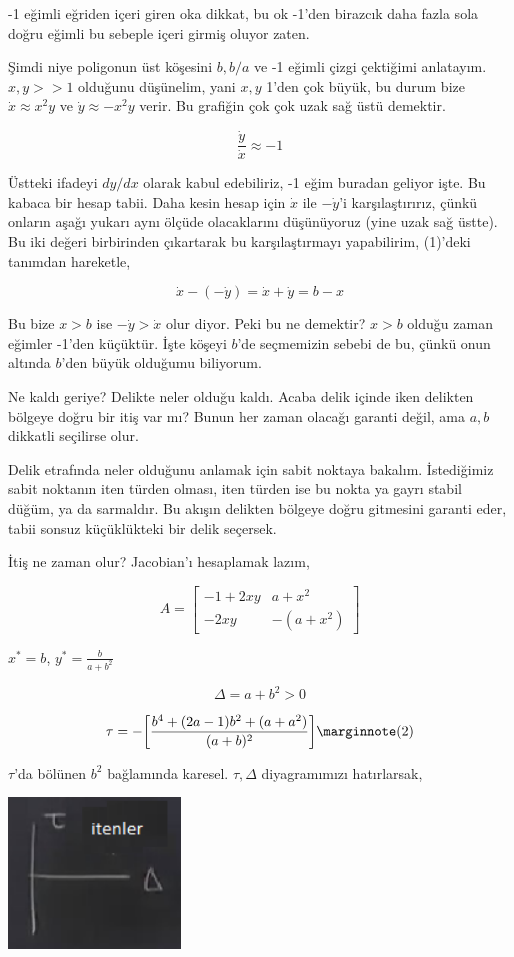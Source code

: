 \documentclass[12pt,fleqn]{article}\usepackage{../../common}
\begin{document}
-1 eğimli eğriden içeri giren oka dikkat, bu ok -1'den birazcık daha fazla sola
doğru eğimli bu sebeple içeri girmiş oluyor zaten.

Şimdi niye poligonun üst köşesini $b,b/a$ ve -1 eğimli çizgi çektiğimi
anlatayım. $x,y >> 1$ olduğunu düşünelim, yani $x,y$ 1'den çok büyük, bu durum
bize $\dot{x} \approx x^2y$ ve $\dot{y} \approx -x^2y$ verir. Bu grafiğin çok
çok uzak sağ üstü demektir.

$$ \frac{\dot{y}}{\dot{x}} \approx -1 $$

Üstteki ifadeyi $dy/dx$ olarak kabul edebiliriz, -1 eğim buradan geliyor
işte. Bu kabaca bir hesap tabii. Daha kesin hesap için $\dot{x}$ ile
$-\dot{y}$'i karşılaştırırız, çünkü onların aşağı yukarı aynı ölçüde
olacaklarını düşünüyoruz (yine uzak sağ üstte). Bu iki değeri birbirinden
çıkartarak bu karşılaştırmayı yapabilirim, (1)'deki tanımdan hareketle, 

$$ \dot{x} - (-\dot{y})  = \dot{x} + \dot{y} = b-x $$

Bu bize $x>b$ ise  $-\dot{y} > \dot{x}$ olur diyor. Peki bu ne demektir? $x>b$
olduğu zaman eğimler -1'den küçüktür. İşte köşeyi $b$'de seçmemizin sebebi de
bu, çünkü onun altında $b$'den büyük olduğumu biliyorum.

Ne kaldı geriye? Delikte neler olduğu kaldı. Acaba delik içinde iken delikten
bölgeye doğru bir itiş var mı? Bunun her zaman olacağı garanti değil, ama $a,b$
dikkatli seçilirse olur.

Delik etrafında neler olduğunu anlamak için sabit noktaya bakalım. İstediğimiz
sabit noktanın iten türden olması, iten türden ise bu nokta ya gayrı stabil
düğüm, ya da sarmaldır. Bu akışın delikten bölgeye doğru gitmesini garanti
eder, tabii sonsuz küçüklükteki bir delik seçersek.

İtiş ne zaman olur? Jacobian'ı hesaplamak lazım,

$$ 
A =
\left[\begin{array}{rr}
-1+2xy & a+x^2 \\ -2xy & -(a+x^2)
\end{array}\right]
$$

$ x^* = b$, $y^* = \frac{b}{a+b^2} $

$$ 
\Delta = a + b^2 > 0 
$$

$$ 
\tau = -\bigg[ \frac{b^4 + (2a-1)b^2 + (a+a^2) }{(a+b)^2} \bigg] 
\mlabel{2}
$$

$\tau$'da bölünen $b^2$ bağlamında karesel. $\tau,\Delta$ diyagramımızı
hatırlarsak,

\includegraphics[height=4cm]{09_17.png}
\end{document}
